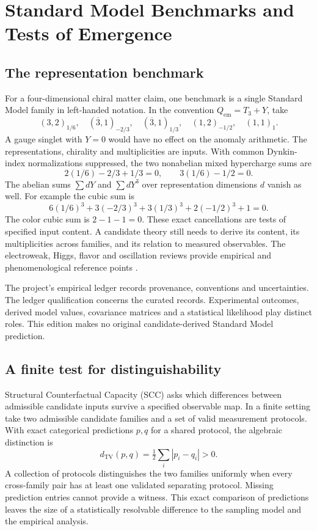 \chapter{Standard Model Benchmarks and Tests of Emergence}\label{ch:comparison}

\section{The representation benchmark}
For a four-dimensional chiral matter claim, one benchmark is a single Standard Model family in left-handed notation. In the convention $Q_{\mathrm{em}}=T_3+Y$, take
\[
 (3,2)_{1/6},\quad(\overline3,1)_{-2/3},\quad
 (\overline3,1)_{1/3},\quad(1,2)_{-1/2},\quad(1,1)_1 .
\]
A gauge singlet with $Y=0$ would have no effect on the anomaly arithmetic. The representations, chirality and multiplicities are inputs. With common Dynkin-index normalizations suppressed, the two nonabelian mixed hypercharge sums are
\[
 2(1/6)-2/3+1/3=0,\qquad 3(1/6)-1/2=0 .
\]
The abelian sums $\sum dY$ and $\sum dY^3$ over representation dimensions $d$ vanish as well. For example the cubic sum is
\[
 6(1/6)^3+3(-2/3)^3+3(1/3)^3+2(-1/2)^3+1=0 .
\]
The color cubic sum is $2-1-1=0$. These exact cancellations are tests of specified input content. A candidate theory still needs to derive its content, its multiplicities across families, and its relation to measured observables. The electroweak, Higgs, flavor and oscillation reviews provide empirical and phenomenological reference points \cite{pdg}.

The project's empirical ledger records provenance, conventions and uncertainties. The ledger qualification concerns the curated records. Experimental outcomes, derived model values, covariance matrices and a statistical likelihood play distinct roles. This edition makes no original candidate-derived Standard Model prediction.

\section{A finite test for distinguishability}
Structural Counterfactual Capacity (SCC) asks which differences between admissible candidate inputs survive a specified observable map. In a finite setting take two admissible candidate families and a set of valid measurement protocols. With exact categorical predictions $p,q$ for a shared protocol, the algebraic distinction is
\[
 d_{\mathrm{TV}}(p,q)=\tfrac12\sum_i|p_i-q_i|>0 .
\]
A collection of protocols distinguishes the two families uniformly when every cross-family pair has at least one validated separating protocol. Missing prediction entries cannot provide a witness. This exact comparison of predictions leaves the size of a statistically resolvable difference to the sampling model and the empirical analysis.

